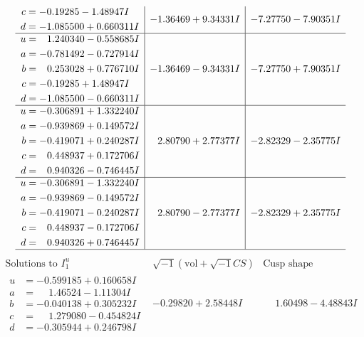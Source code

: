 \documentclass[1p]{elsarticle_modified}
\theoremstyle{definition}
\newcommand{\I}{\sqrt{-1}}
\begin{document}
$$\begin{array}{c|c|c}
\begin{aligned}
c &= -0.19285 - 1.48947 I \\
d &= -1.085500 + 0.660311 I\end{aligned}
 & -1.36469 + 9.34331 I & -7.27750 - 7.90351 I \\ \hline\begin{aligned}
u &= \phantom{-}1.240340 - 0.558685 I \\
a &= -0.781492 - 0.727914 I \\
b &= \phantom{-}0.253028 + 0.776710 I \\
c &= -0.19285 + 1.48947 I \\
d &= -1.085500 - 0.660311 I\end{aligned}
 & -1.36469 - 9.34331 I & -7.27750 + 7.90351 I \\ \hline\begin{aligned}
u &= -0.306891 + 1.332240 I \\
a &= -0.939869 + 0.149572 I \\
b &= -0.419071 + 0.240287 I \\
c &= \phantom{-}0.448937 + 0.172706 I \\
d &= \phantom{-}0.940326 - 0.746445 I\end{aligned}
 & \phantom{-}2.80790 + 2.77377 I & -2.82329 - 2.35775 I \\ \hline\begin{aligned}
u &= -0.306891 - 1.332240 I \\
a &= -0.939869 - 0.149572 I \\
b &= -0.419071 - 0.240287 I \\
c &= \phantom{-}0.448937 - 0.172706 I \\
d &= \phantom{-}0.940326 + 0.746445 I\end{aligned}
 & \phantom{-}2.80790 - 2.77377 I & -2.82329 + 2.35775 I\\
 \hline 
 \end{array}$$\newpage$$\begin{array}{c|c|c}  
\text{Solutions to }I^u_{1}& \I (\text{vol} + \sqrt{-1}CS) & \text{Cusp shape}\\
 \hline 
\begin{aligned}
u &= -0.599185 + 0.160658 I \\
a &= \phantom{-}1.46524 - 1.11304 I \\
b &= -0.040138 + 0.305232 I \\
c &= \phantom{-}1.279080 - 0.454824 I \\
d &= -0.305944 + 0.246798 I\end{aligned}
 & -0.29820 + 2.58448 I & \phantom{-}1.60498 - 4.48843 I \\ \hline\begin{aligned}

\end{aligned}
\end{array}$$
\end{document}
